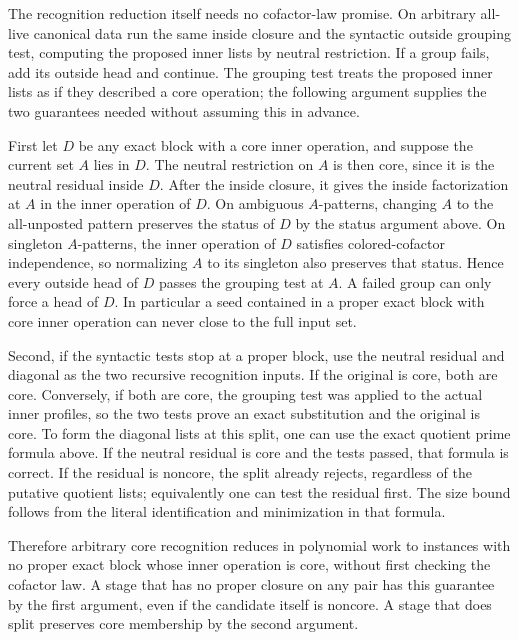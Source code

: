 The recognition reduction itself needs no cofactor-law
promise. On arbitrary all-live canonical data run the
same inside closure and the syntactic outside grouping
test, computing the proposed inner lists by neutral
restriction. If a group fails, add its outside head
and continue. The grouping test treats the proposed
inner lists as if they described a core operation;
the following argument supplies the two guarantees
needed without assuming this in advance.

First let $D$ be any exact block with a core inner
operation, and suppose the current set $A$ lies in
$D$. The neutral restriction on $A$ is then core,
since it is the neutral residual inside $D$. After
the inside closure, it gives the inside factorization
at $A$ in the inner operation of $D$. On ambiguous
$A$-patterns, changing $A$ to the all-unposted pattern
preserves the status of $D$ by the status argument
above. On singleton $A$-patterns, the inner operation
of $D$ satisfies colored-cofactor independence, so
normalizing $A$ to its singleton also preserves that
status. Hence every outside head of $D$ passes the
grouping test at $A$. A failed group can only force
a head of $D$. In particular a seed contained in a
proper exact block with core inner operation can
never close to the full input set.

Second, if the syntactic tests stop at a proper block,
use the neutral residual and diagonal as the two
recursive recognition inputs. If the original is core,
both are core. Conversely, if both are core, the
grouping test was applied to the actual inner profiles,
so the two tests prove an exact substitution and
the original is core. To form the diagonal lists at
this split, one can use the exact quotient prime formula
above. If the neutral residual is core and the tests
passed, that formula is correct. If the residual is
noncore, the split already rejects, regardless of the
putative quotient lists; equivalently one can test
the residual first. The size bound follows from the
literal identification and minimization in that formula.

Therefore arbitrary core recognition reduces in
polynomial work to instances with no proper exact
block whose inner operation is core, without first
checking the cofactor law. A stage that has no
proper closure on any pair has this guarantee by
the first argument, even if the candidate itself is
noncore. A stage that does split preserves core
membership by the second argument.

